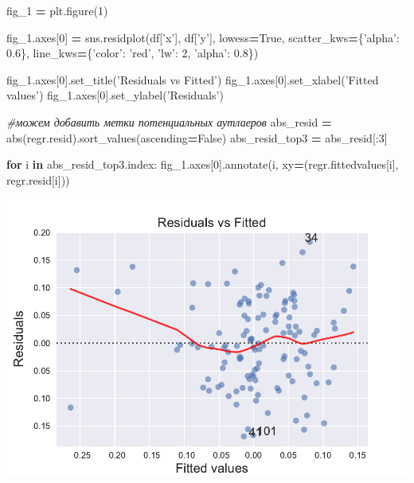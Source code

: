 \documentclass[]{book}
\newenvironment{Shaded}{\begin{snugshade}}{\end{snugshade}}
\newcommand{\BuiltInTok}[1]{#1}
\newcommand{\CommentTok}[1]{\textcolor[rgb]{0.56,0.35,0.01}{\textit{#1}}}
\newcommand{\ControlFlowTok}[1]{\textcolor[rgb]{0.13,0.29,0.53}{\textbf{#1}}}
\newcommand{\DecValTok}[1]{\textcolor[rgb]{0.00,0.00,0.81}{#1}}
\newcommand{\FloatTok}[1]{\textcolor[rgb]{0.00,0.00,0.81}{#1}}
\newcommand{\KeywordTok}[1]{\textcolor[rgb]{0.13,0.29,0.53}{\textbf{#1}}}
\newcommand{\NormalTok}[1]{#1}
\newcommand{\OperatorTok}[1]{\textcolor[rgb]{0.81,0.36,0.00}{\textbf{#1}}}
\newcommand{\StringTok}[1]{\textcolor[rgb]{0.31,0.60,0.02}{#1}}
\newcommand{\VariableTok}[1]{\textcolor[rgb]{0.00,0.00,0.00}{#1}}
\begin{document}
\begin{Shaded}
\begin{Highlighting}[]
\NormalTok{fig_1 }\OperatorTok{=}\NormalTok{ plt.figure(}\DecValTok{1}\NormalTok{)}

\NormalTok{fig_1.axes[}\DecValTok{0}\NormalTok{] }\OperatorTok{=}\NormalTok{ sns.residplot(df[}\StringTok{'x'}\NormalTok{], df[}\StringTok{'y'}\NormalTok{],}
\NormalTok{                                  lowess}\OperatorTok{=}\VariableTok{True}\NormalTok{,}
\NormalTok{                                  scatter_kws}\OperatorTok{=}\NormalTok{\{}\StringTok{'alpha'}\NormalTok{: }\FloatTok{0.6}\NormalTok{\},}
\NormalTok{                                  line_kws}\OperatorTok{=}\NormalTok{\{}\StringTok{'color'}\NormalTok{: }\StringTok{'red'}\NormalTok{, }\StringTok{'lw'}\NormalTok{: }\DecValTok{2}\NormalTok{, }\StringTok{'alpha'}\NormalTok{: }\FloatTok{0.8}\NormalTok{\})}

\NormalTok{fig_1.axes[}\DecValTok{0}\NormalTok{].set_title(}\StringTok{'Residuals vs Fitted'}\NormalTok{)}
\NormalTok{fig_1.axes[}\DecValTok{0}\NormalTok{].set_xlabel(}\StringTok{'Fitted values'}\NormalTok{)}
\NormalTok{fig_1.axes[}\DecValTok{0}\NormalTok{].set_ylabel(}\StringTok{'Residuals'}\NormalTok{)}


\CommentTok{#можем добавить метки потенциальных аутлаеров}
\NormalTok{abs_resid }\OperatorTok{=} \BuiltInTok{abs}\NormalTok{(regr.resid).sort_values(ascending}\OperatorTok{=}\VariableTok{False}\NormalTok{)}
\NormalTok{abs_resid_top3 }\OperatorTok{=}\NormalTok{ abs_resid[:}\DecValTok{3}\NormalTok{]}

\ControlFlowTok{for}\NormalTok{ i }\KeywordTok{in}\NormalTok{ abs_resid_top3.index:}
\NormalTok{    fig_1.axes[}\DecValTok{0}\NormalTok{].annotate(i, }
\NormalTok{                               xy}\OperatorTok{=}\NormalTok{(regr.fittedvalues[i], }
\NormalTok{                                   regr.resid[i]))}
\end{Highlighting}
\end{Shaded}

\includegraphics{02-simplereg_files/figure-latex/unnamed-chunk-18-1.pdf}
\end{document}
